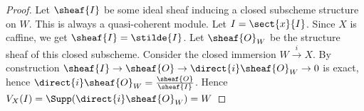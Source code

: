 \begin{proof}
Let $\sheaf{I}$ be some ideal sheaf inducing a closed subscheme structure on $W$.
This is always a quasi-coherent module.
Let $I = \sect{x}{I}$. 
Since $X$ is caffine, we get $\sheaf{I} = \stilde{I}$.
Let $\sheaf{O}_W$ be the structure sheaf of this closed subscheme. 
Consider the closed immersion $W\xrightarrow{i} X$.
By construction $\sheaf{I} \rightarrow \sheaf{O} \rightarrow \direct{i}\sheaf{O}_W \rightarrow 0$ is exact, hence $\direct{i}\sheaf{O}_W = \frac{\sheaf{O}}{\sheaf{I}}$.
Hence $V_X(I) = \Supp(\direct{i}\sheaf{O}_W) = W $
\end{proof}